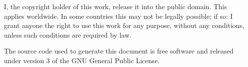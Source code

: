 \documentclass{article}
\begin{document}
    \newpage
    I, the copyright holder of this work, release it into the public domain.
    This applies worldwide. In some countries this may not be legally possible;
    if so: I grant anyone the right to use this work for any purpose, without
    any conditions, unless such conditions are required by law.
    \par\hfill\par
    The source code used to generate this document is free software and released
    under version 3 of the GNU General Public License.
\end{document}
